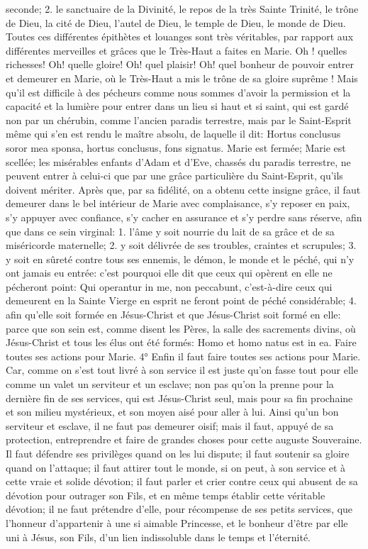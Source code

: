 seconde; 2. le sanctuaire de la Divinité, le repos de la très Sainte Trinité, le trône de Dieu, la cité de Dieu, l'autel de
Dieu, le temple de Dieu, le monde de Dieu. Toutes ces différentes épithètes et louanges sont très véritables, par
rapport aux différentes merveilles et grâces que le Très-Haut a faites en Marie. Oh ! quelles richesses! Oh! quelle
gloire! Oh! quel plaisir! Oh! quel bonheur de pouvoir entrer et demeurer en Marie, où le Très-Haut a mis le trône de
sa gloire suprême !
 Mais qu'il est difficile à des pécheurs comme nous sommes d'avoir la permission et la capacité et la lumière
pour entrer dans un lieu si haut et si saint, qui est gardé non par un chérubin, comme l'ancien paradis terrestre,
mais par le Saint-Esprit même qui s'en est rendu le maître absolu, de laquelle il dit: Hortus conclusus soror mea
sponsa, hortus conclusus, fons signatus. Marie est fermée; Marie est scellée; les misérables enfants d'Adam et
d'Eve, chassés du paradis terrestre, ne peuvent entrer à celui-ci que par une grâce particulière du Saint-Esprit,
qu'ils doivent mériter.
 Après que, par sa fidélité, on a obtenu cette insigne grâce, il faut demeurer dans le bel intérieur de Marie
avec complaisance, s'y reposer en paix, s'y appuyer avec confiance, s'y cacher en assurance et s'y perdre sans
réserve, afin que dans ce sein virginal: 1. l'âme y soit nourrie du lait de sa grâce et de sa miséricorde maternelle; 2.
y soit délivrée de ses troubles, craintes et scrupules; 3. y soit en sûreté contre tous ses ennemis, le démon, le
monde et le péché, qui n'y ont jamais eu entrée: c'est pourquoi elle dit que ceux qui opèrent en elle ne pécheront
point: Qui operantur in me, non peccabunt, c'est-à-dire ceux qui demeurent en la Sainte Vierge en esprit ne feront
point de péché considérable; 4. afin qu'elle soit formée en Jésus-Christ et que Jésus-Christ soit formé en elle:
parce que son sein est, comme disent les Pères, la salle des sacrements divins, où Jésus-Christ et tous les élus
ont été formés: Homo et homo natus est in ea.
Faire toutes ses actions pour Marie.
 4° Enfin il faut faire toutes ses actions pour Marie. Car, comme on s'est tout livré à son service il est juste
qu'on fasse tout pour elle comme un valet un serviteur et un esclave; non pas qu'on la prenne pour la dernière fin
de ses services, qui est Jésus-Christ seul, mais pour sa fin prochaine et son milieu mystérieux, et son moyen aisé
pour aller à lui. Ainsi qu'un bon serviteur et esclave, il ne faut pas demeurer oisif; mais il faut, appuyé de sa
protection, entreprendre et faire de grandes choses pour cette auguste Souveraine. Il faut défendre ses privilèges
quand on les lui dispute; il faut soutenir sa gloire quand on l'attaque; il faut attirer tout le monde, si on peut, à son
service et à cette vraie et solide dévotion; il faut parler et crier contre ceux qui abusent de sa dévotion pour
outrager son Fils, et en même temps établir cette véritable dévotion; il ne faut prétendre d'elle, pour récompense
de ses petits services, que l'honneur d'appartenir à une si aimable Princesse, et le bonheur d'être par elle uni à
Jésus, son Fils, d'un lien indissoluble dans le temps et l'éternité.

